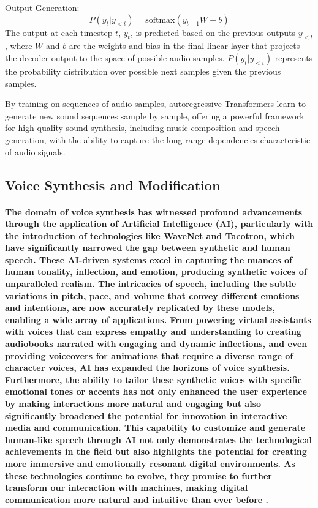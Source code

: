\documentclass[11pt,a4paper,oneside]{report}
\begin{document}
Output Generation:
\begin{equation}
P(y_t | y_{<t}) = \text{softmax}(y_{t-1}W + b)
\end{equation}
The output at each timestep $t$, $y_t$, is predicted based on the previous outputs $y_{<t}$, where $W$ and $b$ are the weights and bias in the final linear layer that projects the decoder output to the space of possible audio samples. $P(y_t | y_{<t})$ represents the probability distribution over possible next samples given the previous samples.

By training on sequences of audio samples, autoregressive Transformers learn to generate new sound sequences sample by sample, offering a powerful framework for high-quality sound synthesis, including music composition and speech generation, with the ability to capture the long-range dependencies characteristic of audio signals.



\subsection{Voice Synthesis and Modification}
\paragraph{The domain of voice synthesis has witnessed profound advancements through the application of Artificial Intelligence (AI), particularly with the introduction of technologies like WaveNet and Tacotron, which have significantly narrowed the gap between synthetic and human speech. 
These AI-driven systems excel in capturing the nuances of human tonality, inflection, and emotion, producing synthetic voices of unparalleled realism. The intricacies of speech, including the subtle variations in pitch, pace, and volume that convey different emotions and intentions, are now accurately replicated by these models, enabling a wide array of applications. 
From powering virtual assistants with voices that can express empathy and understanding to creating audiobooks narrated with engaging and dynamic inflections, and even providing voiceovers for animations that require a diverse range of character voices, AI has expanded the horizons of voice synthesis. 
Furthermore, the ability to tailor these synthetic voices with specific emotional tones or accents has not only enhanced the user experience by making interactions more natural and engaging but also significantly broadened the potential for innovation in interactive media and communication. 
This capability to customize and generate human-like speech through AI not only demonstrates the technological achievements in the field but also highlights the potential for creating more immersive and emotionally resonant digital environments. 
As these technologies continue to evolve, they promise to further transform our interaction with machines, making digital communication more natural and intuitive than ever before \cite{oord2016wavenet}.}
\end{document}
